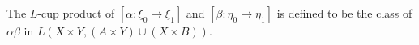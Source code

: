 The $L$-cup product of $[\alpha: \xi_0 \rightarrow \xi_1]$ and $[\beta: \eta_0 \rightarrow \eta_1]$ is defined to be the class of $\alpha\beta$ in $L(X \times Y, (A \times Y) \cup (X \times B))$.

